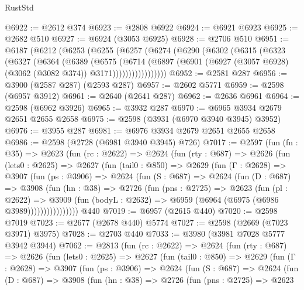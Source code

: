 \begin{lexlean}{RustStd}
\begin{coremodule}
@6922 := @2612 @374
@6923 := @2808 @6922
@6924 := @6921 @6923
@6925 := @2682 @510
@6927 := @6924 (@3053 @6925)
@6928 := @2706 @510
@6951 := @6187
    (@6212
      (@6253
        (@6255
          (@6257
            (@6274
              (@6290
                (@6302
                  (@6315
                    (@6323
                      (@6327
                        (@6364
                          (@6389
                            (@6575
                              (@6714
                                (@6897
                                  (@6901
                                    (@6927 (@3057 @6928) (@3062 (@3082 @374)) @3171)))))))))))))))))
@6952 := @2581 @287
@6956 := @3900 (@2587 @287) (@2593 @287)
@6957 := @2602 @5771
@6959 := @2598 (@6957 @3912)
@6961 := @2640 (@2641 @287)
@6962 := @2636 @6961
@6964 := @2598 (@6962 @3926)
@6965 := @3932 @287
@6970 := @6965 @3934 @2679 @2651 @2655 @2658
@6975 := @2598 (@3931 (@6970 @3940 @3945) @3952)
@6976 := @3955 @287
@6981 := @6976 @3934 @2679 @2651 @2655 @2658
@6986 := @2598 (@2728 (@6981 @3940 @3945) @726)
@7017 := @2597
    (fun (fn : @35) =>
    @2623
      (fun (rc : @2622) =>
      @2624
        (fun (rty : @687) =>
        @2626
          (fun (lets0 : @2625) =>
          @2627
            (fun (tail0 : @850) =>
            @2629
              (fun (Γ : @2628) =>
              @3907
                (fun (ps : @3906) =>
                @2624
                  (fun (S : @687) =>
                  @2624
                    (fun (D : @687) =>
                    @3908
                      (fun (hn : @38) =>
                      @2726
                        (fun (pns : @2725) =>
                        @2623
                          (fun (pl : @2622) =>
                          @3909
                            (fun (bodyL : @2632) => @6959 (@6964 (@6975 (@6986 @3989))))))))))))))))
    @440
@7019 := @6957 (@2615 @440)
@7020 := @2598 @7019
@7023 := @2677 (@2678 @440) @5774
@7027 := @2598 (@2669 (@7023 @3971) @3975)
@7028 := @2703 @440
@7033 := @3980 (@3981 @7028 @5777 @3942 @3944)
@7062 := @2813
    (fun (rc : @2622) =>
    @2624
      (fun (rty : @687) =>
      @2626
        (fun (lets0 : @2625) =>
        @2627
          (fun (tail0 : @850) =>
          @2629
            (fun (Γ : @2628) =>
            @3907
              (fun (ps : @3906) =>
              @2624
                (fun (S : @687) =>
                @2624
                  (fun (D : @687) =>
                  @3908
                    (fun (hn : @38) =>
                    @2726
                      (fun (pns : @2725) =>
                      @2623

\end{coremodule}
\end{lexlean}
